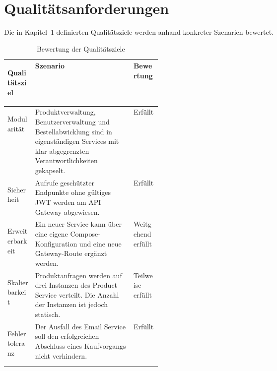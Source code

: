 \section{Qualitätsanforderungen}

Die in Kapitel~1 definierten Qualitätsziele werden anhand konkreter
Szenarien bewertet.

\begin{table}[H]
    \centering
    \renewcommand{\arraystretch}{1.4}
    \begin{tabularx}{\linewidth}{
            >{\bfseries\raggedright\arraybackslash}p{0.18\linewidth}
            >{\raggedright\arraybackslash}X
            >{\raggedright\arraybackslash}p{0.18\linewidth}
    }
        \toprule
        \rowcolor{tableHeaderColor}
        Qualitätsziel & Szenario & Bewertung \\
        \midrule

        Modularität &
        Produktverwaltung, Benutzerverwaltung und Bestellabwicklung sind in
        eigenständigen Services mit klar abgegrenzten Verantwortlichkeiten
        gekapselt. &
        Erfüllt \\

        \rowcolor{tableRowColor}
        Sicherheit &
        Aufrufe geschützter Endpunkte ohne gültiges JWT werden am
        API Gateway abgewiesen. &
        Erfüllt \\

        Erweiterbarkeit &
        Ein neuer Service kann über eine eigene Compose-Konfiguration
        und eine neue Gateway-Route ergänzt werden. &
        Weitgehend erfüllt \\

        \rowcolor{tableRowColor}
        Skalierbarkeit &
        Produktanfragen werden auf drei Instanzen des Product Service
        verteilt. Die Anzahl der Instanzen ist jedoch statisch. &
        Teilweise erfüllt \\

        Fehlertoleranz &
        Der Ausfall des Email Service soll den erfolgreichen Abschluss eines
        Kaufvorgangs nicht verhindern. &
        Erfüllt \\

        \bottomrule
    \end{tabularx}
    \caption{Bewertung der Qualitätsziele}
\end{table}
